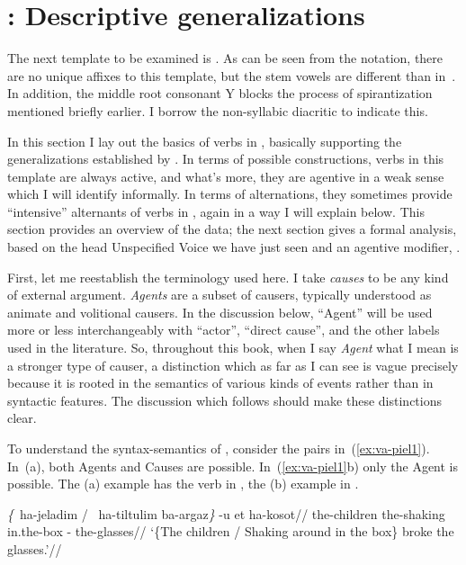 {\section{\tpie: Descriptive generalizations} \label{voice:tpie}
The next template to be examined is {\tpie}. As can be seen from the notation, there are no unique affixes to this template, but the stem vowels are different than in~{\tkal}. In addition, the middle root consonant Y blocks the process of spirantization mentioned briefly earlier. I borrow the non-syllabic diacritic  to indicate this.

In this section I lay out the basics of verbs in {\tpie}, basically supporting the generalizations established by \cite{doron03}. In terms of possible constructions, verbs in this template are always active, and what's more, they are agentive in a weak sense which I will identify informally. In terms of alternations, they sometimes provide ``intensive'' alternants of verbs in {\tkal}, again in a way I will explain below. This section provides an overview of the data; the next section gives a formal analysis, based on the head Unspecified Voice we have just seen and an agentive modifier, {\va}.

First, let me reestablish the terminology used here. I take \emph{causes} to be any kind of external argument. \emph{Agents} are a subset of causers, typically understood as animate and volitional causers. In the discussion below, ``Agent'' will be used more or less interchangeably with ``actor'', ``direct cause'', and the other labels used in the literature. So, throughout this book, when I say \emph{Agent} what I mean is a stronger type of causer, a distinction which as far as I can see is vague precisely because it is rooted in the semantics of various kinds of events rather than in syntactic features. The discussion which follows should make these distinctions clear.

To understand the syntax-semantics of {\tpie}, consider the pairs in~(\ref{ex:va-piel1}). In~(\nextx a), both Agents and Causes are possible. In~(\ref{ex:va-piel1}b) only the Agent is possible. The (a) example has the verb in {\tkal}, the (b) example in {\tpie}.

\pex \label{ex:va-piel1}
	\a \begingl
		\gla \emph{\{}\cmark~ha-jeladim / \cmark~ha-tiltulim ba-argaz\emph{\}} -u et ha-kosot//
		\glb \phantom{\{\cmark~}the-children {} \phantom{\cmark~}the-shaking in.the-box -  the-glasses//
		\glft `\{The children / Shaking around in the box\} broke the glasses.'//
		\endgl
	
}
